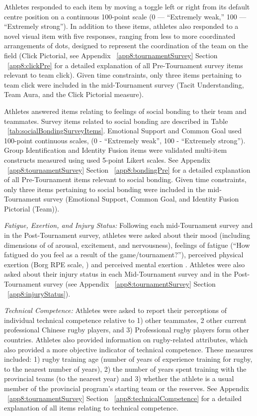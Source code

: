 \begin{CJK}{UTF8}{gbsn}
Athletes responded to each item by moving a toggle left or right from its default centre position on a continuous 100-point scale (0 --- ``Extremely weak,'' 100 --- ``Extremely strong''). In addition to these items, athletes also responded to a novel visual item with five responses, ranging from less to more coordinated arrangements of dots, designed to represent the coordination of the team on the field (Click Pictorial, see Appendix ~\ref{app8:tournamentSurvey} Section ~\ref{app8:clickPre} for a detailed explanation of all Pre-Tournament survey items relevant to team click).  Given time constraints, only three items pertaining to team click were included in the mid-Tournament survey (Tacit Understanding, Team Aura, and the Click Pictorial measure).


Athletes answered items relating to feelings of social bonding to their team and teammates.  Survey items related to social bonding are described in Table ~\ref{tab:socialBondingSurveyItems}.  Emotional Support and Common Goal used 100-point continuous scales, (0 - ``Extremely weak'', 100 - ``Extremely strong'').  Group Identification and Identity Fusion items were validated multi-item constructs measured using used 5-point Likert scales.  See Appendix ~\ref{app8:tournamentSurvey} Section ~\ref{app8:bondingPre} for a detailed explanation of all Pre-Tournament items relevant to social bonding.  Given time constraints, only three items pertaining to social bonding were included in the mid-Tournament survey (Emotional Support, Common Goal, and Identity Fusion Pictorial (Team)).




\textit{Fatigue, Exertion, and Injury Status:} Following each mid-Tournament survey and in the Post-Tournament survey, athletes were asked about their mood (including dimensions of  of arousal, excitement, and nervousness), feelings of fatigue (``How fatigued do you feel as a result of the game/tournament?''), perceived physical exertion (Borg RPE scale, \citep{Borg1990}) and perceived mental exertion \citep[see][]{Noakes2012a}. Athletes were also asked about their injury status in each Mid-Tournament survey and in the Post-Tournament survey (see Appendix ~\ref{app8:tournamentSurvey} Section ~\ref{app8:injuryStatus}).

\textit{Technical Competence:} Athletes were asked to report their perceptions of individual technical competence relative to 1) other teammates, 2 other current professional Chinese rugby players, and  3) Professional rugby players form other countries.  Athletes also provided information on rugby-related attributes, which also provided a more objective indicator of technical competence.  These measures included: 1) rugby training age (number of years of experience training for rugby, to the nearest number of years), 2) the number of years spent training with the provincial teams (to the nearest year) and 3) whether the athlete is a usual member of the provincial program's starting team or the reserves.  See Appendix ~\ref{app8:tournamentSurvey} Section ~\ref{app8:technicalCompetence} for a detailed explanation of all items relating to technical competence.


\end{CJK}
